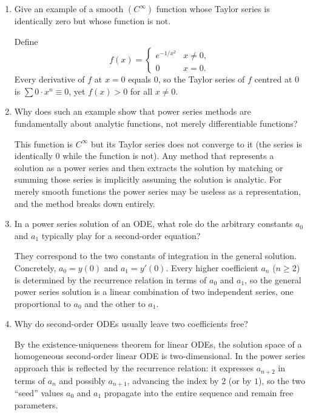\documentclass{self-check}
\begin{document}
\begin{enumerate}[leftmargin=*, itemsep=8pt]
\begin{answer}
    \end{answer}
  \item Give an example of a smooth \((C^{\infty})\) function whose Taylor series is identically zero but whose function is not.
    \begin{answer}
      Define
      \[
        f(x) =
        \begin{cases}
          e^{-1/x^{2}} & x \neq 0, \\
          0          & x = 0.
        \end{cases}
      \]
      Every derivative of \(f\) at \(x = 0\) equals \(0\), so the Taylor series of \(f\) centred at \(0\) is \(\sum 0 \cdot x^{n} \equiv 0\), yet \(f(x) > 0\) for all \(x \neq 0\).
    \end{answer}
  \item Why does such an example show that power series methods are fundamentally about analytic functions, not merely differentiable functions?
    \begin{answer}
      This function is \(C^{\infty}\) but its Taylor series does not converge to it (the series is identically \(0\) while the function is not). Any method that represents a solution as a power series and then extracts the solution by matching or summing those series is implicitly assuming the solution is analytic. For merely smooth functions the power series may be useless as a representation, and the method breaks down entirely.
    \end{answer}
  \item In a power series solution of an ODE, what role do the arbitrary constants \(a_{0}\) and \(a_{1}\) typically play for a second-order equation?
    \begin{answer}
      They correspond to the two constants of integration in the general solution. Concretely, \(a_{0} = y(0)\) and \(a_{1} = y'(0)\). Every higher coefficient \(a_{n}\) (\(n \ge 2\)) is determined by the recurrence relation in terms of \(a_{0}\) and \(a_{1}\), so the general power series solution is a linear combination of two independent series, one proportional to \(a_{0}\) and the other to \(a_{1}\).
    \end{answer}
  \item Why do second-order ODEs usually leave two coefficients free?
    \begin{answer}
      By the existence-uniqueness theorem for linear ODEs, the solution space of a homogeneous second-order linear ODE is two-dimensional. In the power series approach this is reflected by the recurrence relation: it expresses \(a_{n+2}\) in terms of \(a_{n}\) and possibly \(a_{n+1}\), advancing the index by \(2\) (or by \(1\)), so the two ``seed'' values \(a_{0}\) and \(a_{1}\) propagate into the entire sequence and remain free parameters.

\end{answer}
\end{enumerate}
\end{document}
